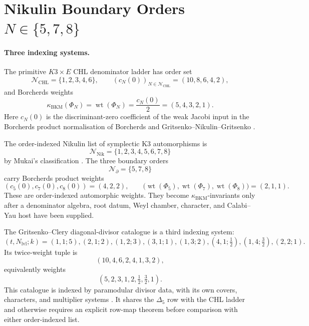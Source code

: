 \providecommand{\kBKM}{\kappa_{\mathrm{BKM}}}
\providecommand{\kcat}{\kappa_{\mathrm{cat}}}
\providecommand{\kch}{\kappa_{\mathrm{ch}}}
\providecommand{\kfib}{\kappa_{\mathrm{fiber}}}
\providecommand{\PhiN}{\Phi_N}
\providecommand{\DeltaFive}{\Delta_5}
\providecommand{\Dfive}{D_5}
\providecommand{\PhiTen}{\Phi_{10}^{\mathrm{un}}}
\providecommand{\wt}{\operatorname{wt}}
\providecommand{\Z}{\mathbb{Z}}

\section*{Nikulin Boundary Orders \(N\in\{5,7,8\}\)}

\paragraph{Three indexing systems.}
The primitive \(K3\times E\) CHL denominator ladder has order set
\[
  \mathcal N_{\mathrm{CHL}}=\{1,2,3,4,6\},
  \qquad
  (c_N(0))_{N\in\mathcal N_{\mathrm{CHL}}}=(10,8,6,4,2),
\]
and Borcherds weights
\[
  \kBKM(\PhiN)=\wt(\PhiN)=\frac{c_N(0)}2=(5,4,3,2,1).
\]
Here \(c_N(0)\) is the discriminant-zero coefficient of the weak Jacobi
input in the Borcherds product normalisation of Borcherds
\cite[Theorem~13.3]{Borcherds1998} and Gritsenko--Nikulin--Gritsenko
\cite{GritsenkoNikulin1998,Gritsenko1994,Gritsenko1999}.

The order-indexed Nikulin list of symplectic K3 automorphisms is
\[
  \mathcal N_{\mathrm{Nik}}=\{1,2,3,4,5,6,7,8\}
\]
by Mukai's classification \cite{Mukai1988}.  The three boundary orders
\[
  \mathcal N_{\partial}=\{5,7,8\}
\]
carry Borcherds product weights
\[
  (c_5(0),c_7(0),c_8(0))=(4,2,2),
  \qquad
  \bigl(\wt(\Phi_5),\wt(\Phi_7),\wt(\Phi_8)\bigr)=(2,1,1).
\]
These are order-indexed automorphic weights.  They become
\(\kBKM\)-invariants only after a denominator algebra, root datum, Weyl
chamber, character, and Calabi--Yau host have been supplied.

The Gritsenko--Clery diagonal-divisor catalogue is a third indexing
system:
\[
 (t,N_{\mathrm{lvl}};k)=
 (1,1;5),(2,1;2),(1,2;3),(3,1;1),(1,3;2),
 (4,1;\tfrac12),(1,4;\tfrac32),(2,2;1).
\]
Its twice-weight tuple is
\[
  (10,4,6,2,4,1,3,2),
\]
equivalently weights
\[
  (5,2,3,1,2,\tfrac12,\tfrac32,1).
\]
This catalogue is indexed by paramodular divisor data, with its own
covers, characters, and multiplier systems \cite{GritsenkoClery2013}.
It shares the \(\DeltaFive\) row with the CHL ladder and otherwise
requires an explicit row-map theorem before comparison with either
order-indexed list.

